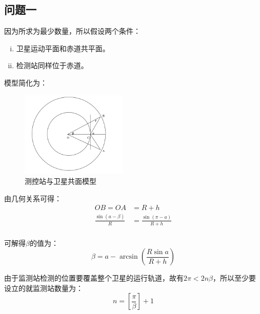 \documentclass[UTF8]{ctexart}
\begin{document}
        \subsection{问题一}
        因为所求为最少数量，所以假设两个条件：
        \begin{enumerate}[(i)]
            \item 卫星运动平面和赤道共平面。
            \item 检测站同样位于赤道。
        \end{enumerate}
        \par 模型简化为：
        \begin{figure}[!htbp]
            \centering
            \includegraphics[width=0.45\textwidth]{第一问}
            \caption{测控站与卫星共面模型} 
        \end{figure}
        \par 由几何关系可得：
        \begin{align}
            OB =OA&=R+h\\
            \frac{\sin (a-\beta)}{R} &=\frac{\sin (\pi-a)}{R+h}\\
        \end{align}
        \par 可解得$\beta$的值为：
        \begin{equation}
            \beta =a-\arcsin (\frac{R \sin a}{R+h})
        \end{equation}
        \par 由于监测站检测的位置要覆盖整个卫星的运行轨道，故有$2\pi <2n \beta$，所以至少要设立的就监测站数量为：
        \begin{equation}
            n=[\frac{\pi}{\beta}]+1
        \end{equation}
\end{document}
